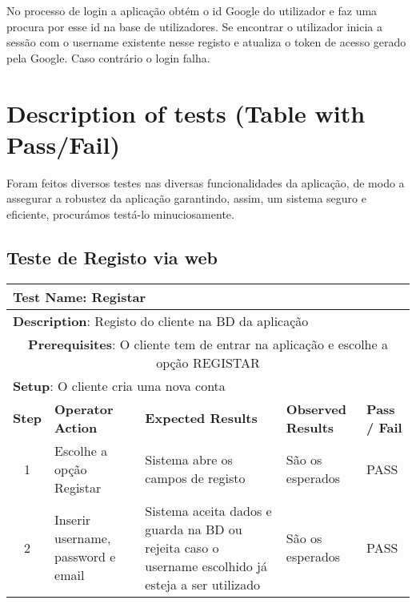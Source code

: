\documentclass[12pt]{article} %
\begin{document}
No processo de login a aplicação obtém o id Google do utilizador e faz uma procura por esse id na base de utilizadores. Se encontrar o utilizador inicia a sessão com o username existente nesse registo e atualiza o token de acesso gerado pela Google. Caso contrário o login falha.


\pagebreak




\section{Description of tests (Table with Pass/Fail)} %
\label{sec:Tests}
Foram feitos diversos testes nas diversas funcionalidades da aplicação, de modo a assegurar a robustez da aplicação garantindo, assim, um sistema seguro e eficiente, procurámos testá-lo minuciosamente.

\subsection{Teste de Registo via web}
\begin{table}[ht!]
	\begin{tabular}{|c|p{4cm}|p{4cm}|p{3cm}|p{1cm}|}
		\hline
		\multicolumn{5}{|l|}{\textbf{Test Name}: Registar}\\
		\hline
		\multicolumn{5}{|l|}{\textbf{Description}: Registo do cliente na BD da aplicação}\\
		\hline
		\multicolumn{5}{|p{14,5cm}|}{\textbf{Prerequisites}: O cliente tem de entrar na aplicação e escolhe a opção REGISTAR}\\
		\hline
		\multicolumn{5}{|l|}{\textbf{Setup}: O cliente cria uma nova conta}\\
		\hline
		\textbf{Step} & \textbf{Operator Action} & \textbf{Expected Results} & \textbf{Observed Results} & \textbf{Pass / Fail}\\
		\hline
		1 & Escolhe a opção Registar & Sistema abre os campos de registo & São os esperados & PASS\\
		\hline
		2 & Inserir username, password e email & Sistema aceita dados e guarda na BD ou rejeita caso o username escolhido já esteja a ser utilizado & São os esperados & PASS\\
		\hline
	\end{tabular}
\end{table}
\pagebreak
\end{document}
